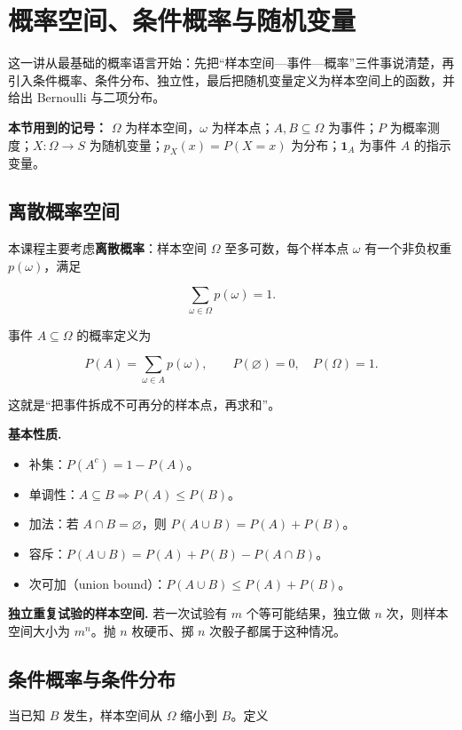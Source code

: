 \section{概率空间、条件概率与随机变量}


这一讲从最基础的概率语言开始：先把“样本空间—事件—概率”三件事说清楚，再引入条件概率、条件分布、独立性，最后把随机变量定义为样本空间上的函数，并给出 Bernoulli 与二项分布。

\textbf{本节用到的记号：} $\Omega$ 为样本空间，$\omega$ 为样本点；$A,B\subseteq\Omega$ 为事件；$P$ 为概率测度；$X:\Omega\to S$ 为随机变量；$p_X(x)=P(X=x)$ 为分布；$\mathbf 1_A$ 为事件 $A$ 的指示变量。

\subsection{离散概率空间}


本课程主要考虑\textbf{离散概率}：样本空间 $\Omega$ 至多可数，每个样本点 $\omega$ 有一个非负权重 $p(\omega)$，满足

\[
\sum_{\omega\in\Omega}p(\omega)=1.
\]

事件 $A\subseteq\Omega$ 的概率定义为

\[
P(A)=\sum_{\omega\in A}p(\omega),\qquad P(\varnothing)=0,\quad P(\Omega)=1.
\]

这就是“把事件拆成不可再分的样本点，再求和”。

\textbf{基本性质.}

\begin{itemize}
\item 补集：$P(A^c)=1-P(A)$。
\item 单调性：$A\subseteq B\Rightarrow P(A)\le P(B)$。
\item 加法：若 $A\cap B=\varnothing$，则 $P(A\cup B)=P(A)+P(B)$。
\item 容斥：$P(A\cup B)=P(A)+P(B)-P(A\cap B)$。
\item 次可加（union bound）：$P(A\cup B)\le P(A)+P(B)$。
\end{itemize}


\textbf{独立重复试验的样本空间.} 若一次试验有 $m$ 个等可能结果，独立做 $n$ 次，则样本空间大小为 $m^n$。抛 $n$ 枚硬币、掷 $n$ 次骰子都属于这种情况。

\subsection{条件概率与条件分布}


当已知 $B$ 发生，样本空间从 $\Omega$ 缩小到 $B$。定义

